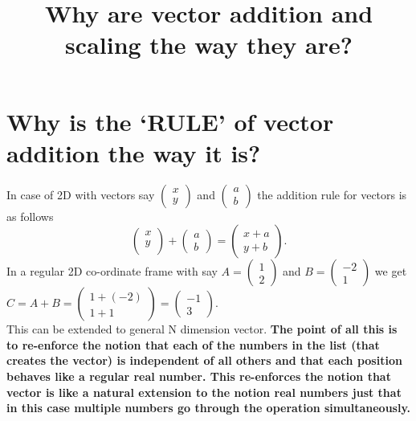 \documentclass[12pt]{article}
\title{Why are vector addition and scaling the way they are?}
\author{}
\date{}
\newcommand{\comment}[1]{}
\begin{document}
\maketitle

\section{Why is the `RULE'  of vector addition the way it is?}

In case of 2D with vectors say $ \comment{Column-Vector: x,y} \begin{pmatrix} x \\ y \end{pmatrix} $ and $ \comment{Column-Vector: a,b} \begin{pmatrix} a \\ b \end{pmatrix} $ the addition rule for vectors is as follows
\[
  \begin{pmatrix} x \\ y \\  \end{pmatrix} + \begin{pmatrix} a \\ b \end{pmatrix} = \begin{pmatrix} x+a \\ y+b \end{pmatrix}.
\]
In a regular 2D co-ordinate frame with say $ A = \comment{Column-Vector: 1,2} \begin{pmatrix} 1 \\ 2 \end{pmatrix} $ and $ B = \comment{Column-Vector: -2,1} \begin{pmatrix} -2 \\ 1 \end{pmatrix} $ we get $ C = A + B = \comment{Column-Vector: 1+(-2),1+1} \begin{pmatrix} 1+(-2) \\ 1+1 \end{pmatrix} = \comment{Column-Vector: -1,3} \begin{pmatrix} -1 \\ 3 \end{pmatrix} $.\\

This can be extended to general N dimension vector.
\textbf{The point of all this is to re-enforce the notion that each of the numbers in the list (that creates the vector) is independent of all others and that each position behaves like a regular real number. This re-enforces the notion that vector is like a natural extension to the notion real numbers just that in this case multiple numbers go through the operation simultaneously.} \\
\end{document}
